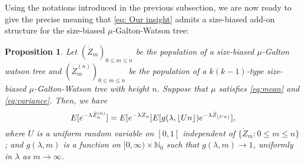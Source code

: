 \documentclass[12pt,a4paper]{amsart}
\DeclarePairedDelimiter\floor{\lfloor}{\rfloor}
\newtheorem{prop}[thm]{Proposition}
\numberwithin{equation}{section}
\begin{document}
	Using the notations introduced in the previous subsection, we are now ready to give the precise meaning that \eqref{eq: Our insight} admits a size-biased add-on structure for the size-biased $\mu$-Galton-Watson tree:
\begin{prop}\label{prop: size-biased add-on of size-biased tree }
	Let $(\dot Z_m)_{0 \leq m \leq n}$ be the population of a size-biased $\mu$-Galton watson tree and $(\ddot Z^{(n)}_m)_{0 \leq m \leq n}$ be the population of a $k(k-1)$-type size-biased $\mu$-Galton-Watson tree with height $n$.
	Suppose that $\mu$ satisfies \eqref{eq:mean} and \eqref{eq:variance}.
	Then, we have
\[
	E [ e^{- \lambda \ddot Z_n^{(n)}} ]
	= E [e^{-\lambda \dot Z_n}] E[g(\lambda, \floor{Un})e^{-\lambda \dot Z_{\floor{Un}}}],
\]
where $U$ is a uniform random variable on $[0,1]$ independent of $\{\dot Z_m: 0\le m\le n\}$;
and $g(\lambda, m)$ is a function on $[0,\infty) \times \mathbb N_0$ such that
$g(\lambda, m) \to 1$, uniformly in $\lambda$ as $m\to \infty$.
\end{prop}
\end{document}
